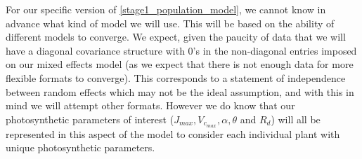 \documentclass[11pt]{article} %
\begin{document}
For our specific version of \eqref{stage1_population_model}, we cannot know in advance what kind of model we will use. This will be based on the ability of different models to converge. We expect, given the paucity of data that we will have a diagonal covariance structure with 0's in the non-diagonal entries imposed on our mixed effects model (as we expect that there is not enough data for more flexible formats to converge). This corresponds to a statement of independence between random effects which may not be the ideal assumption, and with this in mind we will attempt other formats. However we do know that our photosynthetic parameters of interest ($J_{max}, V_{c_{max}}, \alpha, \theta$ and $R_d$) will all be represented in this aspect of the model to consider each individual plant with unique photosynthetic parameters.
\newpage



\end{document}
